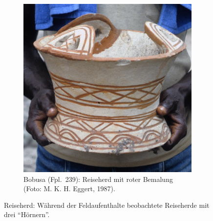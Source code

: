 \begin{figure}[tb]
\begin{subfigure}[t]{\columnwidth}
 \includegraphics[width=\textwidth]{fig/BBS87_Herdgef_E87-04-4.jpg}
 \caption{Bobusa (Fpl.~239): Reiseherd mit roter Bemalung (Foto: M. K. H. Eggert, 1987).}
 \label{fig:Reiseherd_B}
\end{subfigure}
 \caption{Reiseherd: Während der Feldaufenthalte beobachtete Reiseherde mit drei \enquote{Hörnern}.}
 \label{fig:Reiseherd}
\end{figure}


